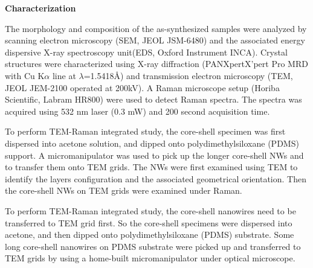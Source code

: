 \documentclass[11pt]{article} %
\begin{document}
\textbf{Characterization}

The morphology and composition of the as-synthesized samples were analyzed by scanning electron microscopy (SEM, JEOL JSM-6480) and the associated energy dispersive X-ray spectroscopy unit(EDS, Oxford Instrument INCA). Crystal structures were characterized using X-ray diffraction (PANXpertX’pert Pro MRD with Cu K$\alpha$ line at $\lambda$=1.5418\AA) and transmission electron microscopy (TEM, JEOL JEM-2100  operated at 200kV). A Raman microscope setup (Horiba Scientific, Labram HR800) were used to detect Raman spectra. The spectra was acquired using 532 nm laser (0.3 mW) and 200 second acquisition time.

To perform TEM-Raman integrated study, the core-shell specimen was first dispersed into acetone solution, and dipped onto polydimethylsiloxane (PDMS) support. A micromanipulator was used to pick up the longer core-shell NWs and to transfer them onto TEM grids. The NWs were first examined using TEM to identify the  layers configuration and the associated geometrical orientation. Then the core-shell NWs on TEM grids were examined under Raman.

To perform TEM-Raman integrated study, the core-shell nanowires need to be transferred to TEM grid first. So the core-shell specimens were dispersed into acetone, and then dipped onto polydimethylsiloxane (PDMS) substrate. Some long core-shell nanowires on PDMS substrate were picked up and transferred to TEM grids by using a home-built micromanipulator under optical microscope.
\end{document}
